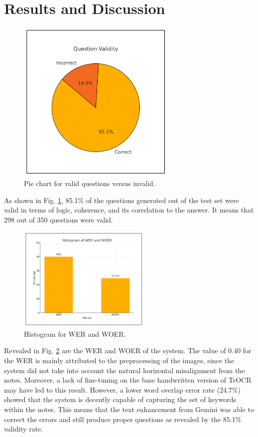\documentclass[conference]{IEEEtran}
\begin{document}
\section{Results and Discussion}
    \begin{figure}[H]
        \centerline{\includegraphics[width=3in]{validity.png}}
        \vspace{-0.4cm}
        \caption{Pie chart for valid questions versus invalid.} 
        \label{validity}
    \end{figure}
    As shown in Fig. \ref{validity}, 85.1\% of the questions generated out of 
    the test set were valid in terms of logic, coherence, and 
    its correlation to the answer. It means that 298 out of 350 questions 
    were valid. 

    \begin{figure}[H]
        \centerline{\includegraphics[width=2.5in]{wer.png}}
        \vspace{-0.4cm}
        \caption{Histogram for WER and WOER.} 
        \label{wer}
    \end{figure}
    Revealed in Fig. \ref{wer} are the WER and WOER of the system. 
    The value of 0.40 for the WER is mainly attributed to the 
    preprocessing of the images, since the system did not take 
    into account the natural horizontal misalignment from the 
    notes. Moreover, a lack of fine-tuning on the base handwritten 
    version of TrOCR may have led to this result. However, a 
    lower word overlap error rate (24.7\%) showed that the system 
    is decently capable of capturing the set of keywords within 
    the notes. This means that the text enhancement from Gemini 
    was able to correct the errors and still produce proper questions 
    as revealed by the 85.1\% validity rate.
\end{document}
